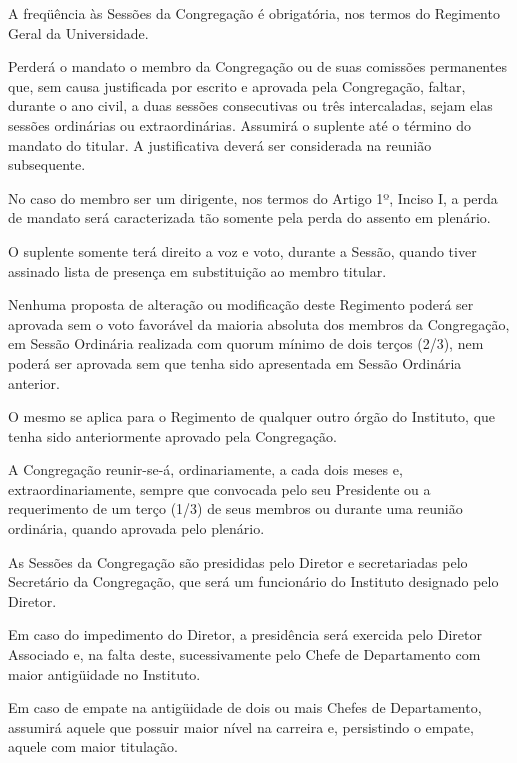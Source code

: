 \documentclass{documento}
\begin{document}
\artigo A freqüência às Sessões da Congregação é obrigatória, nos termos do Regimento Geral da Universidade.

\paragrafo Perderá o mandato o membro da Congregação ou de suas comissões permanentes que, sem causa justificada por escrito e aprovada pela Congregação, faltar, durante o ano civil, a duas sessões consecutivas ou três intercaladas, sejam elas sessões ordinárias ou extraordinárias. Assumirá o suplente até o término do mandato do titular. A justificativa deverá ser considerada na reunião subsequente.

\paragrafo No caso do membro ser um dirigente, nos termos do Artigo 1º, Inciso I, a perda de mandato será caracterizada tão somente pela perda do assento em plenário.

\paragrafo O suplente somente terá direito a voz e voto, durante a Sessão, quando tiver assinado lista de presença em substituição ao membro titular.

\artigo Nenhuma proposta de alteração ou modificação deste Regimento poderá ser aprovada sem o voto favorável da maioria absoluta dos membros da Congregação, em Sessão Ordinária realizada com quorum mínimo de dois terços (2/3), nem poderá ser aprovada sem que tenha sido apresentada em Sessão Ordinária anterior.

\paragrafounico O mesmo se aplica para o Regimento de qualquer outro órgão do Instituto, que tenha sido anteriormente aprovado pela Congregação.



\artigo A Congregação reunir-se-á, ordinariamente, a cada dois meses e, extraordinariamente, sempre que convocada pelo seu Presidente ou a requerimento de um terço (1/3) de seus membros ou durante uma reunião ordinária, quando aprovada pelo plenário.

\artigo As Sessões da Congregação são presididas pelo Diretor e secretariadas pelo Secretário da Congregação, que será um funcionário do Instituto designado pelo Diretor.

\paragrafo Em caso do impedimento do Diretor, a presidência será exercida pelo Diretor Associado e, na falta deste, sucessivamente pelo Chefe de Departamento com maior antigüidade no Instituto.

\paragrafo Em caso de empate na antigüidade de dois ou mais Chefes de Departamento, assumirá aquele que possuir maior nível na carreira e, persistindo o empate, aquele com maior titulação.
\end{document}
